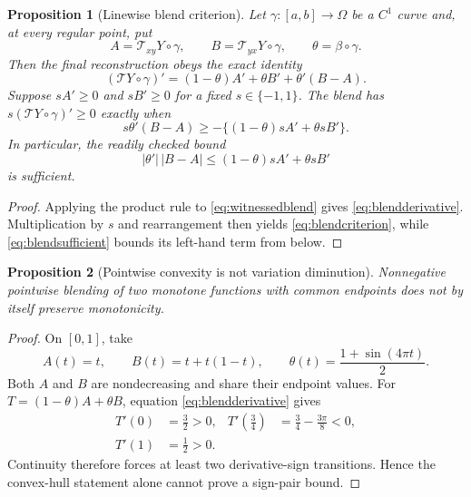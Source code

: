 \documentclass[journal]{IEEEtran}
\newtheorem{proposition}{Proposition}
\newcommand{\Tcal}{\mathcal{T}}
\begin{document}
\begin{proposition}[Linewise blend criterion]
Let \(\gamma:[a,b]\to\Omega\) be a \(C^1\) curve and, at every regular point,
put
\begin{equation}
 A=\Tcal_{xy}Y\circ\gamma,\qquad
 B=\Tcal_{yx}Y\circ\gamma,\qquad
 \theta=\beta\circ\gamma.
\end{equation}
Then the final reconstruction obeys the exact identity
\begin{equation}
 (\Tcal Y\circ\gamma)'
 =(1-\theta)A'+\theta B'+\theta'(B-A).
 \label{eq:blendderivative}
\end{equation}
Suppose \(sA'\geq0\) and \(sB'\geq0\) for a fixed
\(s\in\{-1,1\}\). The blend has \(s(\Tcal Y\circ\gamma)'\geq0\) exactly when
\begin{equation}
 s\theta'(B-A)
 \geq-\{(1-\theta)sA'+\theta sB'\}.
 \label{eq:blendcriterion}
\end{equation}
In particular, the readily checked bound
\begin{equation}
 |\theta'|\,|B-A|
 \leq(1-\theta)sA'+\theta sB'
 \label{eq:blendsufficient}
\end{equation}
is sufficient.
\end{proposition}

\begin{proof}
Applying the product rule to \eqref{eq:witnessedblend} gives
\eqref{eq:blendderivative}. Multiplication by \(s\) and rearrangement then
yields \eqref{eq:blendcriterion}, while \eqref{eq:blendsufficient} bounds its
left-hand term from below.
\end{proof}

\begin{proposition}[Pointwise convexity is not variation diminution]
Nonnegative pointwise blending of two monotone functions with common
endpoints does not by itself preserve monotonicity.
\end{proposition}

\begin{proof}
On \([0,1]\), take
\begin{equation}
 A(t)=t,\qquad B(t)=t+t(1-t),\qquad
 \theta(t)=\frac{1+\sin(4\pi t)}{2}.
\end{equation}
Both \(A\) and \(B\) are nondecreasing and share their endpoint values.
For \(T=(1-\theta)A+\theta B\), equation
\eqref{eq:blendderivative} gives
\begin{align}
 T'(0)&=\frac32>0,&
 T'(\tfrac34)&=\frac34-\frac{3\pi}{8}<0,\nonumber\\
 T'(1)&=\frac12>0.&&
\end{align}
Continuity therefore forces at least two derivative-sign transitions. Hence
the convex-hull statement alone cannot prove a sign-pair bound.
\end{proof}
\end{document}
